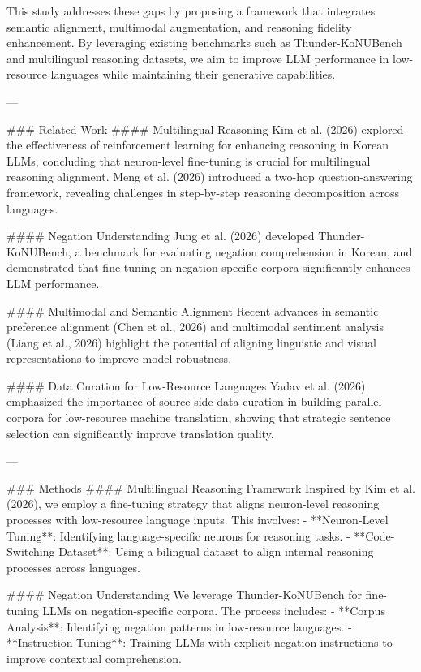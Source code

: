 This study addresses these gaps by proposing a framework that integrates semantic alignment, multimodal augmentation, and reasoning fidelity enhancement. By leveraging existing benchmarks such as Thunder-KoNUBench and multilingual reasoning datasets, we aim to improve LLM performance in low-resource languages while maintaining their generative capabilities.

---

### Related Work
#### Multilingual Reasoning
Kim et al. (2026) explored the effectiveness of reinforcement learning for enhancing reasoning in Korean LLMs, concluding that neuron-level fine-tuning is crucial for multilingual reasoning alignment. Meng et al. (2026) introduced a two-hop question-answering framework, revealing challenges in step-by-step reasoning decomposition across languages.

#### Negation Understanding
Jung et al. (2026) developed Thunder-KoNUBench, a benchmark for evaluating negation comprehension in Korean, and demonstrated that fine-tuning on negation-specific corpora significantly enhances LLM performance.

#### Multimodal and Semantic Alignment
Recent advances in semantic preference alignment (Chen et al., 2026) and multimodal sentiment analysis (Liang et al., 2026) highlight the potential of aligning linguistic and visual representations to improve model robustness.

#### Data Curation for Low-Resource Languages
Yadav et al. (2026) emphasized the importance of source-side data curation in building parallel corpora for low-resource machine translation, showing that strategic sentence selection can significantly improve translation quality.

---

### Methods
#### Multilingual Reasoning Framework
Inspired by Kim et al. (2026), we employ a fine-tuning strategy that aligns neuron-level reasoning processes with low-resource language inputs. This involves:
- **Neuron-Level Tuning**: Identifying language-specific neurons for reasoning tasks.
- **Code-Switching Dataset**: Using a bilingual dataset to align internal reasoning processes across languages.

#### Negation Understanding
We leverage Thunder-KoNUBench for fine-tuning LLMs on negation-specific corpora. The process includes:
- **Corpus Analysis**: Identifying negation patterns in low-resource languages.
- **Instruction Tuning**: Training LLMs with explicit negation instructions to improve contextual comprehension.

